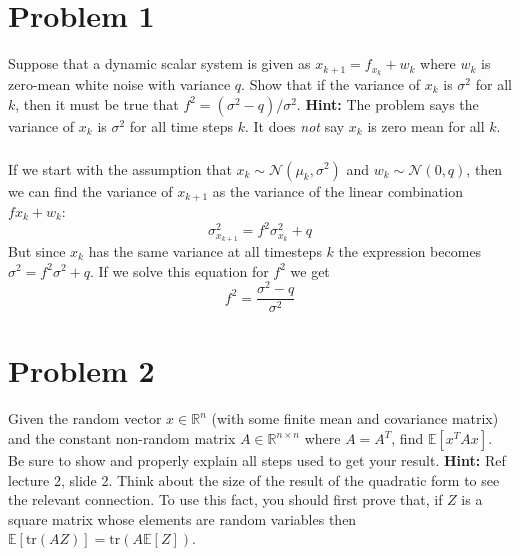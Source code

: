 \documentclass[11pt]{article}
\begin{document}
\thispagestyle{empty}

\newlength{\boxlength}\setlength{\boxlength}{\textwidth}
\addtolength{\boxlength}{-4mm}

\begin{center}
\end{center}

\section*{Problem 1}
Suppose that a dynamic scalar system is given as $x_{k+1}=f_{x_k}+w_k$ where $w_k$ is zero-mean white noise with variance $q$. Show that if the variance of $x_k$ is $\sigma^2$ for all $k$, then it must be true that $f^2=(\sigma^2-q)/\sigma^2$. \textbf{Hint:} The problem says the variance of $x_k$ is $\sigma^2$ for all time steps $k$. It does \textit{not} say $x_k$ is zero mean for all $k$.

\subparagraph*{}
If we start with the assumption that $x_k\sim\mathcal{N}(\mu_k,\sigma^2)$ and $w_k\sim\mathcal{N}(0,q)$, then we can find the variance of $x_{k+1}$ as the variance of the linear combination $fx_k+w_k$:
\begin{equation*}
	\sigma_{x_{k+1}}^2 = f^2\sigma_{x_k}^2 + q
\end{equation*}
But since $x_k$ has the same variance at all timesteps $k$ the expression becomes $\sigma^2=f^2\sigma^2+q$. If we solve this equation for $f^2$ we get
\begin{equation*}
	f^2 = \frac{\sigma^2-q}{\sigma^2}
\end{equation*}

\section*{Problem 2}
Given the random vector $x\in\mathbb{R}^n$ (with some finite mean and covariance matrix) and the constant non-random matrix $A\in\mathbb{R}^{n\times n}$ where $A=A^T$, find $\mathbb{E}[x^TAx]$. Be sure to show and properly explain all steps used to get your result. \textbf{Hint:} Ref lecture 2, slide 2. Think about the size of the result of the quadratic form to see the relevant connection. To use this fact, you should first prove that, if $Z$ is a square matrix whose elements are random variables then $\mathbb{E}[\text{tr}(AZ)]=\text{tr}(A\mathbb{E}[Z])$.
\end{document}
